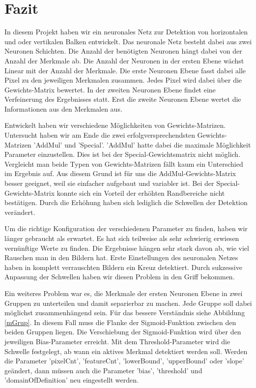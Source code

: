 \newpage
\section{Fazit}

In diesem Projekt haben wir ein neuronales Netz zur Detektion von horizontalen und oder vertikalen Balken entwickelt. Das neuronale Netz besteht dabei aus zwei Neuronen Schichten. Die Anzahl der benötigten Neuronen hängt dabei von der Anzahl der Merkmale ab. Die Anzahl der Neuronen in der ersten Ebene wächst Linear mit der Anzahl der Merkmale. Die erste Neuronen Ebene fasst dabei alle Pixel zu den jeweiligen Merkmalen zusammen. Jedes Pixel wird dabei über die Gewichts-Matrix bewertet. In der zweiten Neuronen Ebene findet eine Verfeinerung des Ergebnisses statt. Erst die zweite Neuronen Ebene wertet die Informationen aus den Merkmalen aus.

Entwickelt haben wir verschiedene Möglichkeiten von Gewichts-Matrizen. Untersucht haben wir am Ende die zwei erfolgversprechendsten Gewichts-Matrizen 'AddMul' und 'Special'. 'AddMul' hatte dabei die maximale Möglichkeit Parameter einzustellen. Dies ist bei der Special-Gewichtsmatrix nicht möglich. Vergleicht man beide Typen von Gewichts-Matrizen fällt kaum ein Unterschied im Ergebnis auf. Aus diesem Grund ist für uns die AddMul-Gewichts-Matrix besser geeignet, weil sie einfacher aufgebaut und variabler ist. Bei der Special-Gewichts-Matrix konnte sich ein Vorteil der erhöhten Randbereiche nicht bestätigen. Durch die Erhöhung haben sich lediglich die Schwellen der Detektion verändert.

Um die richtige Konfiguration der verschiedenen Parameter zu finden, haben wir länger gebraucht als erwartet. Es hat sich teilweise als sehr schwierig erwiesen vernünftige Werte zu finden. Die Ergebnisse hängen sehr stark davon ab, wie viel Rauschen man in den Bildern hat. Erste Einstellungen des neuronalen Netzes haben in komplett verrauschten Bildern ein Kreuz detektiert. Durch sukzessive Anpassung der Schwellen haben wir diesen Problem in den Griff bekommen. 

Ein weiteres Problem war es, die Merkmale der ersten Neuronen Ebene in zwei Gruppen zu unterteilen und damit separierbar zu machen. Jede Gruppe soll dabei möglichst zusammenhängend sein. Für das bessere Verständnis siehe Abbildung \ref{mGrup}. In diesem Fall muss die Flanke der Sigmoid-Funktion zwischen den beiden Gruppen liegen. Die Verschiebung der Sigmoid-Funktion wird über den jeweiligen Bias-Parameter erreicht. Mit dem Threshold-Parameter wird die Schwelle festgelegt, ab wann ein aktives Merkmal detektiert werden soll. Werden die Parameter 'pixelCnt', 'featureCnt', 'lowerBound', 'upperBound' oder 'slope' geändert, dann müssen auch die Parameter 'bias', 'threshold' und 'domainOfDefinition' neu eingestellt werden.

